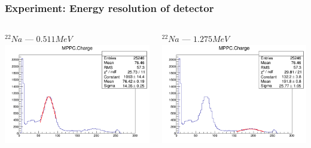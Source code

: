 \documentclass[11pt]{beamer}
\begin{document}
\begin{frame}
    \frametitle{Experiment: Energy resolution of detector}
    \begin{columns}
        \begin{column}{0.5\textwidth}
            $^{22}Na$ --- $0.511 MeV$\\
            \includegraphics[width=1\textwidth]{figures/setup3.png}
            
        \end{column}
                \begin{column}{0.5\textwidth}
                    $^{22}Na$ --- $1.275 MeV$\\
            \includegraphics[width=1\textwidth]{figures/setup4.png}
        \end{column}
    \end{columns} 
    

\end{frame}
\end{document}
